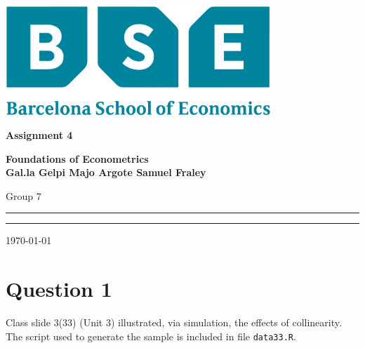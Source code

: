 \documentclass[12pt,a4paper]{article}
\begin{document}
\begin{titlepage}
\centering
\includegraphics[width=0.75\textwidth]{LaTex/imgs/bse_logo.pdf}
\par\vspace{0.75cm}
	{\huge\bfseries Assignment 4 \par}
    {\large\bfseries Foundations of Econometrics \\
                      Gal.la Gelpi
                      Majo Argote
                      Samuel Fraley \par
                        Group 7\par}
	\vspace{0.25cm}
    \noindent\rule{\textwidth}{1pt}
    {\Large 
        \par}
    \noindent\rule{\textwidth}{1pt}
	\vfill
	{\large \today\par}
\end{titlepage}
\newpage

\section*{Question 1}
Class slide 3(33) (Unit 3) illustrated, via simulation, the effects of collinearity. The script used to generate the sample is included in file \texttt{data33.R}.
\end{document}
